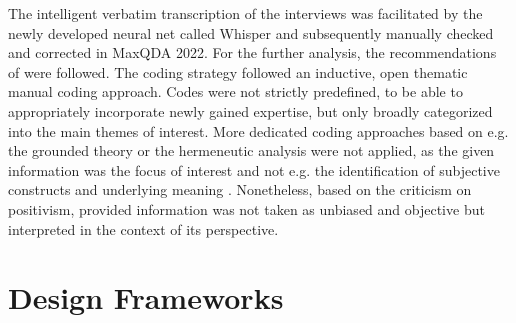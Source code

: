 The intelligent verbatim transcription of the interviews was facilitated by the newly developed neural net called Whisper \autocite{openaiIntroducingWhisper2022,openaiWhisper2023} and subsequently manually checked and corrected in MaxQDA 2022. For the further analysis, the recommendations of \textcite{radikerFocusedAnalysisQualitative2020} were followed. The coding strategy followed an inductive, open thematic manual coding approach. Codes were not strictly predefined, to be able to appropriately incorporate newly gained expertise, but only broadly categorized into the main themes of interest. More dedicated coding approaches based on e.g. the grounded theory or the hermeneutic analysis were not applied, as the given information was the focus of interest and not e.g. the identification of subjective constructs and underlying meaning \autocite{pelzResearchMethodsSocial}. Nonetheless, based on the criticism on positivism, provided information was not taken as unbiased and objective but interpreted in the context of its perspective.

\section{Design Frameworks}\label{sec:design_framework}

